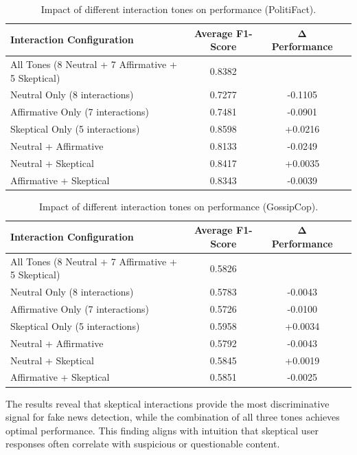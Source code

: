 \begin{table}[htbp]
\centering
\caption{Impact of different interaction tones on performance (PolitiFact).}
\label{tab:ablation_tones_politifact}
\begin{tabular}{lccc}
\toprule
\textbf{Interaction Configuration} & \textbf{Average F1-Score} & \textbf{Δ Performance} \\
\midrule
    All Tones (8 Neutral + 7 Affirmative + 5 Skeptical) & 0.8382 & \- \\
\midrule
Neutral Only (8 interactions) & 0.7277 & -0.1105 \\
Affirmative Only (7 interactions) & 0.7481 & -0.0901 \\
Skeptical Only (5 interactions) & 0.8598 & +0.0216 \\
\midrule
Neutral + Affirmative & 0.8133 & -0.0249 \\
Neutral + Skeptical & 0.8417 & +0.0035 \\
Affirmative + Skeptical & 0.8343 & -0.0039 \\
\bottomrule
\end{tabular}
\end{table}

\begin{table}[htbp]
\centering
\caption{Impact of different interaction tones on performance (GossipCop).}
\label{tab:ablation_tones_gossipcop}
\begin{tabular}{lccc}
\toprule
\textbf{Interaction Configuration} & \textbf{Average F1-Score} & \textbf{Δ Performance} \\
\midrule
    All Tones (8 Neutral + 7 Affirmative + 5 Skeptical) & 0.5826 & \- \\
\midrule
Neutral Only (8 interactions) & 0.5783 & -0.0043 \\
Affirmative Only (7 interactions) & 0.5726 & -0.0100 \\
Skeptical Only (5 interactions) & 0.5958 & +0.0034 \\
\midrule
Neutral + Affirmative & 0.5792 & -0.0043 \\
Neutral + Skeptical & 0.5845 & +0.0019 \\
Affirmative + Skeptical & 0.5851 & -0.0025 \\
\bottomrule
\end{tabular}
\end{table}

The results reveal that skeptical interactions provide the most discriminative signal for fake news detection, while the combination of all three tones achieves optimal performance. This finding aligns with intuition that skeptical user responses often correlate with suspicious or questionable content.

